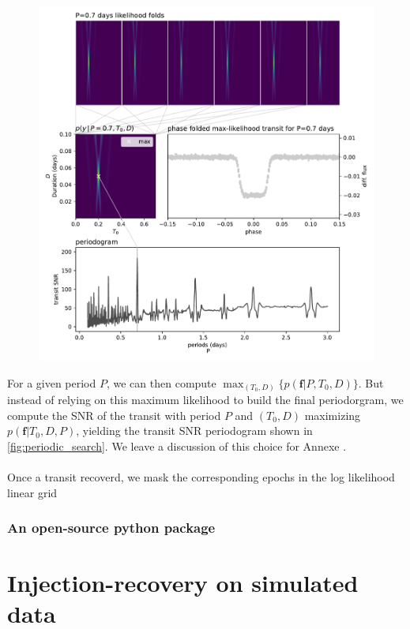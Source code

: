 \documentclass{aastex631}
\begin{document}
\begin{figure}[H]
    \begin{centering}
        \includegraphics[width=0.8
        \linewidth]{../figures/principle_tiles_combined.pdf}
        \caption{}
        \label{fig:periodic_search}
    \end{centering}
\end{figure}

For a given period $P$, we can then compute $\max_{(T_0, D)}\{p(\bm{f} \vert P, T_0 ,D)\}$. But instead of relying on this maximum likelihood to build the final periodorgram, we compute the SNR of the transit with period $P$ and $(T_0, D)$ maximizing $p(\bm{f} \vert T_0 ,D, P)$, yielding the transit SNR periodogram shown in \autoref{fig:periodic_search}. We leave a discussion of this choice for Annexe .
\\\\
Once a transit recoverd, we mask the corresponding epochs in the log likelihood linear grid

\subsubsection{An open-source python package}


\section{Injection-recovery on simulated data}\label{simu}
\end{document}
